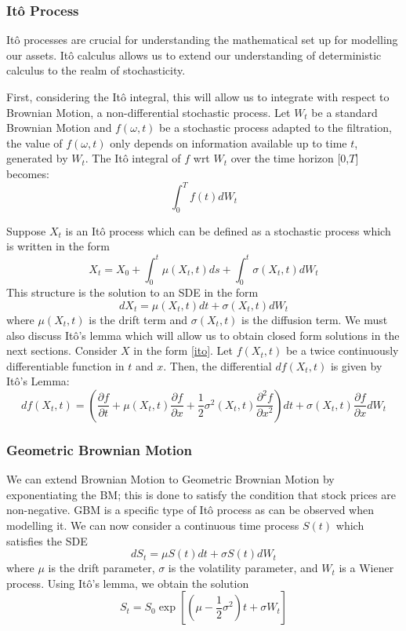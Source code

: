 \documentclass[12pt]{article}
\newcommand{\newp}
    {
    \vskip 0.5cm 
  }
\numberwithin{equation}{section}
\begin{document}
\subsubsection{It\^{o} Process}
It\^{o} processes are crucial for understanding the mathematical set up for 
modelling our assets. It\^{o} calculus allows us to extend our understanding of 
deterministic calculus to the realm of stochasticity\autocite{benchugg}.
\newp 
First, considering the It\^{o} integral, this will allow us to integrate with respect 
to Brownian Motion, a non-differential stochastic process. Let $W_t$ be a 
standard Brownian Motion and $f(\omega,t)$ be a stochastic process adapted to the 
filtration, the value of $f(\omega,t)$ only depends on information available 
up to time $t$, generated by $W_t$. The It\^{o} integral of $f$ wrt $W_t$ over 
the time horizon [0,$T$] becomes: 
\begin{equation}
\int_0^T f(t) dW_t
\end{equation}

Suppose $X_t$ is an It\^{o} process which can be 
defined as a stochastic process which is written in the form 
\begin{equation}
  X_t = X_0 + \int^t_0 \mu(X_t,t) ds + \int^t_0 \sigma(X_t,t) dW_t
\end{equation}
This structure is the solution to an SDE in the form 
\begin{equation}\label{ito}
  dX_t = \mu(X_t,t)dt + \sigma(X_t,t)dW_t
\end{equation}
where $\mu(X_t,t)$ is the drift term and $\sigma(X_t,t)$ is the diffusion term.
We must also discuss It\^{o}'s lemma which will allow us to obtain closed 
form solutions in the next sections. Consider $X$ in the form \ref{ito}. 
Let $f(X_t,t)$ be a twice continuously differentiable function in $t$ and $x$. 
Then, the differential $df(X_t,t)$ is given by It\^{o}'s Lemma:
\begin{equation}
  df(X_t,t) = \left( \frac{\partial f}{\partial t} + \mu(X_t,t) \frac{\partial f}
  {\partial x} + \frac{1}{2} \sigma^2(X_t,t) \frac{\partial^2 f}{\partial x^2} \right) 
  dt + \sigma(X_t,t) \frac{\partial f}{\partial x}dW_t
\end{equation}


\subsubsection{Geometric Brownian Motion}
We can extend Brownian Motion to Geometric Brownian Motion by exponentiating the BM; 
this is done to satisfy the condition that stock prices are non-negative\autocite{brownianmotion}. GBM 
is a specific type of It\^{o} process as can be observed when modelling it.
We can now consider a continuous time process $S(t)$ which satisfies the SDE
\begin{equation}
  dS_t = \mu S(t)dt + \sigma S(t)dW_t 
\end{equation}
where $\mu$ is the drift parameter, $\sigma$ is the volatility parameter, and 
$W_t$ is a Wiener process. Using It\^{o}'s lemma, we obtain the solution
\begin{equation}
  S_t = S_0 \exp \left[(\mu-\frac{1}{2}\sigma^2) t + \sigma W_t\right]
\end{equation}
\end{document}
